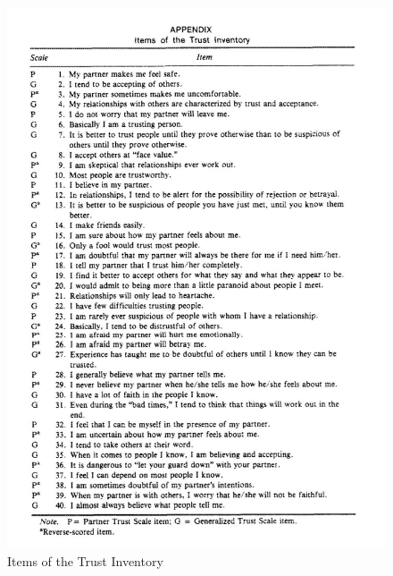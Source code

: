 \documentclass[a4paper,11pt]{article}%
\renewcommand{\\}{\vspace*{0.5\baselineskip} \newline}
\begin{document}
	\begin{figure}[H]
	\centering
		\begin{footnotesize}
			\includegraphics[scale=0.6]{Abbildungen/CouchEtAl_1996_TrustScale}\\
			\caption[Abbildung 1]{Items of the Trust Inventory \citep[305-323]{couch1996assessment}}
			\label{Trust-Inventory}
		\end{footnotesize}
	\end{figure}
	
\end{document}
